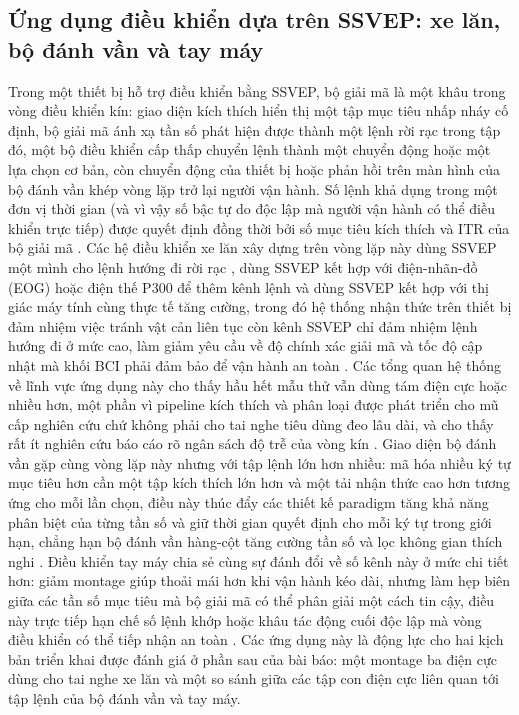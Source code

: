 \documentclass[11pt,a4paper,twoside,asymmetric]{article}
\begin{document}
\subsection{Ứng dụng điều khiển dựa trên SSVEP: xe lăn, bộ đánh vần và tay máy}
Trong một thiết bị hỗ trợ điều khiển bằng SSVEP, bộ giải mã là một khâu trong vòng điều khiển kín: giao diện kích thích hiển thị một tập mục tiêu nhấp nháy cố định, bộ giải mã ánh xạ tần số phát hiện được thành một lệnh rời rạc trong tập đó, một bộ điều khiển cấp thấp chuyển lệnh thành một chuyển động hoặc một lựa chọn cơ bản, còn chuyển động của thiết bị hoặc phản hồi trên màn hình của bộ đánh vần khép vòng lặp trở lại người vận hành. Số lệnh khả dụng trong một đơn vị thời gian (và vì vậy số bậc tự do độc lập mà người vận hành có thể điều khiển trực tiếp) được quyết định đồng thời bởi số mục tiêu kích thích và ITR của bộ giải mã \cite{R4,R5}. Các hệ điều khiển xe lăn xây dựng trên vòng lặp này dùng SSVEP một mình cho lệnh hướng đi rời rạc \cite{R3,R6}, dùng SSVEP kết hợp với điện-nhãn-đồ (EOG) \cite{R2} hoặc điện thế P300 \cite{R7} để thêm kênh lệnh và dùng SSVEP kết hợp với thị giác máy tính cùng thực tế tăng cường, trong đó hệ thống nhận thức trên thiết bị đảm nhiệm việc tránh vật cản liên tục còn kênh SSVEP chỉ đảm nhiệm lệnh hướng đi ở mức cao, làm giảm yêu cầu về độ chính xác giải mã và tốc độ cập nhật mà khối BCI phải đảm bảo để vận hành an toàn \cite{R7,R8}. Các tổng quan hệ thống về lĩnh vực ứng dụng này cho thấy hầu hết mẫu thử vẫn dùng tám điện cực hoặc nhiều hơn, một phần vì pipeline kích thích và phân loại được phát triển cho mũ cấp nghiên cứu chứ không phải cho tai nghe tiêu dùng đeo lâu dài, và cho thấy rất ít nghiên cứu báo cáo rõ ngân sách độ trễ của vòng kín \cite{R10,R11}. Giao diện bộ đánh vần gặp cùng vòng lặp này nhưng với tập lệnh lớn hơn nhiều: mã hóa nhiều ký tự mục tiêu hơn cần một tập kích thích lớn hơn và một tải nhận thức cao hơn tương ứng cho mỗi lần chọn, điều này thúc đẩy các thiết kế paradigm tăng khả năng phân biệt của từng tần số và giữ thời gian quyết định cho mỗi ký tự trong giới hạn, chẳng hạn bộ đánh vần hàng-cột tăng cường tần số \cite{R4} và lọc không gian thích nghi \cite{R5}. Điều khiển tay máy chia sẻ cùng sự đánh đổi về số kênh này ở mức chi tiết hơn: giảm montage giúp thoải mái hơn khi vận hành kéo dài, nhưng làm hẹp biên giữa các tần số mục tiêu mà bộ giải mã có thể phân giải một cách tin cậy, điều này trực tiếp hạn chế số lệnh khớp hoặc khâu tác động cuối độc lập mà vòng điều khiển có thể tiếp nhận an toàn \cite{R9}. Các ứng dụng này là động lực cho hai kịch bản triển khai được đánh giá ở phần sau của bài báo: một montage ba điện cực dùng cho tai nghe xe lăn và một so sánh giữa các tập con điện cực liên quan tới tập lệnh của bộ đánh vần và tay máy.
\end{document}
